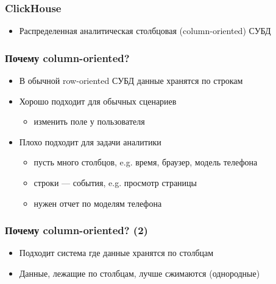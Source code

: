 \documentclass[xetex,mathserif,serif]{beamer}
\begin{document}
\begin{frame}
	\frametitle{ClickHouse}

	\begin{itemize}
		\item Распределенная аналитическая столбцовая (column-oriented) СУБД
	\end{itemize}
\end{frame}


\begin{frame}
	\frametitle{Почему column-oriented?}

	\begin{center}
	\end{center}

	\begin{itemize}
		\item В обычной row-oriented СУБД данные хранятся по строкам
		\item Хорошо подходит для обычных сценариев
		      \begin{itemize}
			      \item изменить поле у пользователя
		      \end{itemize}
		\item Плохо подходит для задачи аналитики
		      \begin{itemize}
			      \item пусть много столбцов, e.g. время, браузер, модель телефона
			      \item строки — события, e.g. просмотр страницы
			      \item нужен отчет по моделям телефона
		      \end{itemize}
	\end{itemize}
\end{frame}


\begin{frame}
    \frametitle{Почему column-oriented? (2)}

	\begin{center}
	\end{center}

	\begin{itemize}
		\item Подходит система где данные хранятся по столбцам
		\item Данные, лежащие по столбцам, лучше сжимаются (однородные)
	\end{itemize}
\end{frame}
\end{document}
